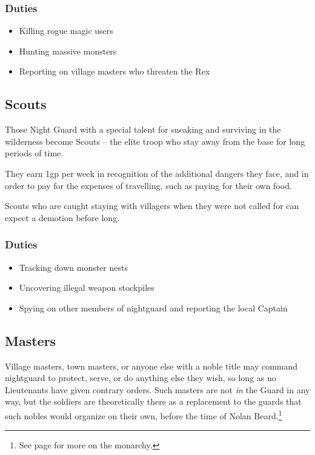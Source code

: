 \begin{multicols}{2}
\subsubsection{Duties}

\begin{itemize}

	\item{Killing rogue magic users}
	\item{Hunting massive monsters}
	\item{Reporting on village masters who threaten the Rex}
\end{itemize}

\subsection{Scouts}

Those Night Guard with a special talent for sneaking and surviving in the wilderness become Scouts -- the elite troop who stay away from the base for long periods of time.

They earn 1gp per week in recognition of the additional dangers they face, and in order to pay for the expenses of travelling, such as paying for their own food.

Scouts who are caught staying with villagers when they were not called for can expect a demotion before long.

\subsubsection{Duties}

\begin{itemize}

	\item{Tracking down monster nests}
	\item{Uncovering illegal weapon stockpiles}
	\item{Spying on other members of \gls{nightguard} and reporting the local Captain}

\end{itemize}

\subsection{Masters}

Village masters, town masters, or anyone else with a noble title may command \gls{nightguard} to protect, serve, or do anything else they wish, so long as no Lieutenants have given contrary orders.
Such masters are not \textit{in} the Guard in any way, but the soldiers are theoretically there as a replacement to the guards that such nobles would organize on their own, before the time of Nolan Beard.\footnote{See page \pageref{nolan} for more on the monarchy.}


\end{multicols}
